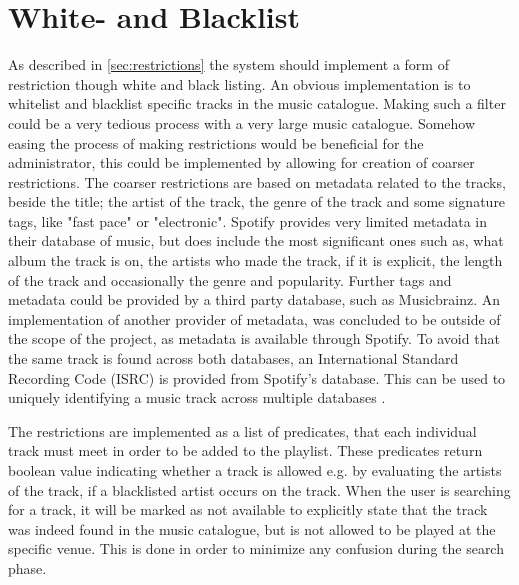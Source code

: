 \section{White- and Blacklist}
As described in \cref{sec:restrictions} the system should implement a form of restriction though white and black listing. An obvious implementation is to whitelist and blacklist specific tracks in the music catalogue. Making such a filter could be a very tedious process with a very large music catalogue. Somehow easing the process of making restrictions would be beneficial for the administrator, this could be implemented by allowing for creation of coarser restrictions. The coarser restrictions are based on metadata related to the tracks, beside the title; the artist of the track, the genre of the track and some signature tags, like "fast pace" or "electronic". Spotify provides very limited metadata in their database of music, but does include the most significant ones such as, what album the track is on, the artists who made the track, if it is explicit, the length of the track and occasionally the genre and popularity. Further tags and metadata could be provided by a third party database, such as Musicbrainz. An implementation of another provider of metadata, was concluded to be outside of the scope of the project, as metadata is available through Spotify. To avoid that the same track is found across both databases, an International Standard Recording Code (ISRC) is provided from Spotify’s database. This can be used to uniquely identifying a music track across multiple databases \cite{isrc}.

The restrictions are implemented as a list of predicates, that each individual track must meet in order to be added to the playlist. These predicates return boolean value indicating whether a track is allowed e.g. by evaluating the artists of the track, if a blacklisted artist occurs on the track. When the user is searching for a track, it will be marked as not available to explicitly state that the track was indeed found in the music catalogue, but is not allowed to be played at the specific venue. This is done in order to minimize any confusion during the search phase.
